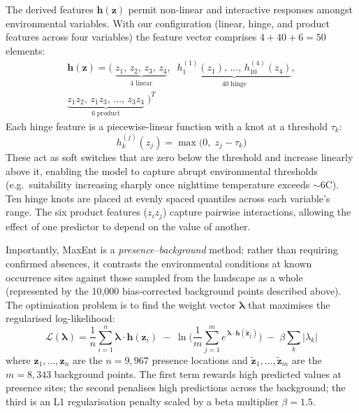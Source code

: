\documentclass[11pt, a4paper, twocolumn]{article}
\begin{document}
The derived features $\mathbf{h}(\mathbf{z})$ permit non-linear and interactive responses amongst environmental variables. 
With our configuration (linear, hinge, and product features across four variables) 
the feature vector comprises $4 + 40 + 6 = 50$ elements:
\begin{multline}
\mathbf{h}(\mathbf{z}) = \bigl(\;\underbrace{z_1,\, z_2,\, z_3,\, z_4}_{4\;\text{linear}},\;\;
\underbrace{h_{1}^{(1)}(z_1),\,\ldots,\,h_{10}^{(4)}(z_4)}_{40\;\text{hinge}}, \\
\underbrace{z_1 z_2,\, z_1 z_3,\, \ldots,\, z_3 z_4}_{6\;\text{product}}\;\bigr)^{T}
\label{eq:features}
\end{multline}
Each hinge feature is a piecewise-linear function with a knot at a threshold $\tau_k$:
\begin{equation}
h_k^{(j)}(z_j) = \max\!\bigl(0,\; z_j - \tau_k\bigr)
\label{eq:hinge}
\end{equation}
These act as soft switches that are zero below the threshold and increase linearly above it, enabling the model to capture abrupt environmental thresholds (e.g.\ suitability increasing sharply once nighttime temperature exceeds ${\sim}6$\textdegree C). Ten hinge knots are placed at evenly spaced quantiles across each variable's range. The six product features ($z_i z_j$) capture pairwise interactions, allowing the effect of one predictor to depend on the value of another.

Importantly, MaxEnt is a \textit{presence--background} method: rather than requiring confirmed absences, 
it contrasts the environmental conditions at known occurrence sites against those sampled from the 
landscape as a whole (represented by the 10,000 bias-corrected background points described above). 
The optimisation problem is to find the weight vector $\boldsymbol{\lambda}$ that maximises the regularised log-likelihood:
\begin{equation}
\mathcal{L}(\boldsymbol{\lambda}) = \frac{1}{n}\sum_{i=1}^{n} \boldsymbol{\lambda} \cdot \mathbf{h}(\mathbf{z}_i) \;-\; \ln\!\Biggl(\frac{1}{m}\sum_{j=1}^{m} e^{\,\boldsymbol{\lambda}\cdot\mathbf{h}(\tilde{\mathbf{z}}_j)}\Biggr) \;-\; \beta\sum_{k}|\lambda_k|
\label{eq:loglik}
\end{equation}
where $\mathbf{z}_1, \ldots, \mathbf{z}_n$ are the $n = 9{,}967$ presence locations 
and $\tilde{\mathbf{z}}_1, \ldots, \tilde{\mathbf{z}}_m$ are the $m = 8{,}343$ background points. 
The first term rewards high predicted values at presence sites; 
the second penalises high predictions across the background; the third is an L1 regularisation 
penalty scaled by a beta multiplier $\beta = 1.5$. 
\end{document}
